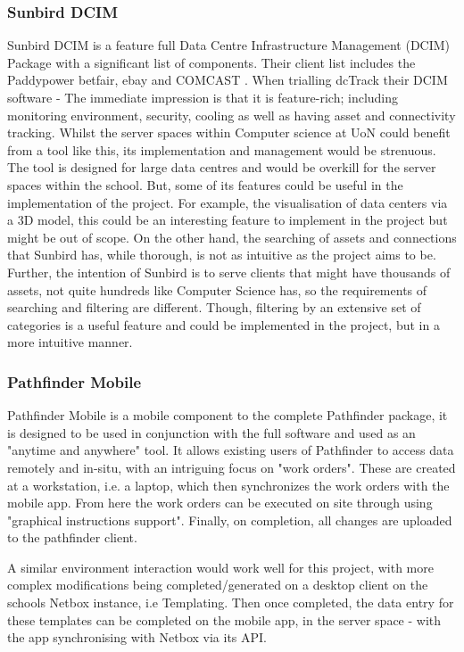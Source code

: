 \documentclass [11pt,a4paper]{article}
\begin{document}
\subsubsection{Sunbird DCIM}
\label{sec:sunbird}
Sunbird DCIM is a feature full Data Centre Infrastructure Management (DCIM) Package with a significant list of components. Their client list includes the Paddypower betfair, ebay and COMCAST \cite{Sunbird-we-know-data-centres}. When trialling dcTrack their DCIM software - The immediate impression is that it is feature-rich; including monitoring environment, security, cooling as well as having asset and connectivity tracking. Whilst the server spaces within Computer science at UoN could benefit from a tool like this, its implementation and management would be strenuous. The tool is designed for large data centres and would be overkill for the server spaces within the school. But, some of its features could be useful in the implementation of the project. For example, the visualisation of data centers via a 3D model, this could be an interesting feature to implement in the project but might be out of scope. On the other hand, the searching of assets and connections that Sunbird has, while thorough, is not as intuitive as the project aims to be. Further, the intention of Sunbird is to serve clients that might have thousands of assets, not quite hundreds like Computer Science has, so the requirements of searching and filtering are different. Though, filtering by an extensive set of categories is a useful feature and could be implemented in the project, but in a more intuitive manner. 

\subsubsection{Pathfinder Mobile}
\label{sec:pathfinder}
Pathfinder Mobile is a mobile component to the complete Pathfinder package, it is designed to be used in conjunction with the full software and used as an "anytime and anywhere" \cite{PathfinderMobile} tool. It allows existing users of Pathfinder to access data remotely and in-situ, with an intriguing focus on "work orders". These are created at a workstation, i.e. a laptop, which then synchronizes the work orders with the mobile app. From here the work orders can be executed on site through using "graphical instructions support"\cite{Pathfinder}. Finally, on completion, all changes are uploaded to the pathfinder client. 

A similar environment interaction would work well for this project, with more complex modifications being completed/generated on a desktop client on the schools Netbox instance, i.e Templating. Then once completed, the data entry for these templates can be completed on the mobile app, in the server space - with the app synchronising with Netbox via its API. 
\end{document}
